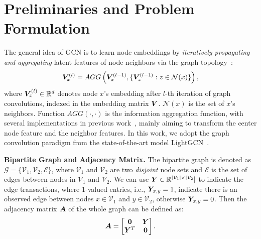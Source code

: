\section{Preliminaries and Problem Formulation}
\label{sec:pre}


The general idea of GCN is to learn node embeddings by \textit{iteratively propagating and aggregating} latent features of node neighbors via the graph topology~\cite{wu2019simplifying,lightgcn,kipf2016semi}:
\begin{equation}
\setlength\abovedisplayskip{2pt}
\setlength\belowdisplayskip{2pt}
\boldsymbol{V}_x^{(l)} = AGG\left(\boldsymbol{V}_x^{(l-1)}, \{\boldsymbol{V}_z^{(l-1)}: z \in \mathcal{N}(x)\}\right),
\end{equation}%
where {\small$\boldsymbol{V}_x^{(l)} \in \mathbb{R}^d$} denotes node $x$'s embedding after $l$-th iteration of graph convolutions, indexed in the embedding matrix {\small $\boldsymbol{V}$}. 
{\small $\mathcal{N}(x)$} is the set of $x$'s neighbors.
Function $AGG(\cdot, \cdot)$ is the information aggregation function, with several implementations in previous work~\cite{kipf2016semi,graphsage,gat,xu2018powerful}, mainly aiming to transform the center node feature and the neighbor features.
In this work, we adopt the graph convolution paradigm from the state-of-the-art model LightGCN~\cite{lightgcn}.


\vspace{0.05in}

\noindent\textbf{Bipartite Graph and Adjacency Matrix.} 
The bipartite graph is denoted as $\mathcal{G}=\{\mathcal{V}_1, \mathcal{V}_2, \mathcal{E}\}$, where $\mathcal{V}_1$ and  $\mathcal{V}_2$ are two \textit{disjoint} node sets and $\mathcal{E}$ is the set of edges between nodes in $\mathcal{V}_1$ and $\mathcal{V}_2$.
We can use $\boldsymbol{Y} \in \mathbb{R}^{|\mathcal{V}_1|\times |\mathcal{V}_2}|$ to indicate the edge transactions, where 1-valued entries, i.e., $\boldsymbol{Y}_{x,y}=1$, indicate there is an observed edge between nodes $x\in \mathcal{V}_1$ and $y \in \mathcal{V}_2$, otherwise $\boldsymbol{Y}_{x,y}=0$.
Then the adjacency matrix $\boldsymbol{A}$ of the whole graph can be defined as:
\begin{equation}
\setlength\abovedisplayskip{2pt}
\setlength\belowdisplayskip{2pt}
\emb{A} = 
\begin{bmatrix}
\emb{0} & \emb{Y} \\
\emb{Y}^T & \emb{0}
\end{bmatrix}.
\end{equation}%



